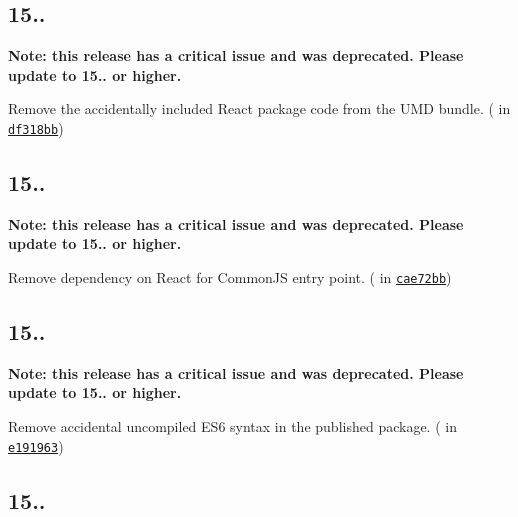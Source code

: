 \subsection*{15..}

{\bfseries Note\+: this release has a critical issue and was deprecated. Please update to 15.. or higher.}


\begin{DoxyItemize}
\item Remove the accidentally included React package code from the U\+MD bundle. (\href{https://github.com/acdlite}{\tt } in \href{https://github.com/reactjs/prop-types/commit/df318bba8a89bc5aadbb0292822cf4ed71d27ace}{\tt df318bb})
\end{DoxyItemize}

\subsection*{15..}

{\bfseries Note\+: this release has a critical issue and was deprecated. Please update to 15.. or higher.}


\begin{DoxyItemize}
\item Remove dependency on React for Common\+JS entry point. (\href{https://github.com/acdlite}{\tt } in \href{https://github.com/reactjs/prop-types/commit/cae72bb281a3766c765e3624f6088c3713567e6d}{\tt cae72bb})
\end{DoxyItemize}

\subsection*{15..}

{\bfseries Note\+: this release has a critical issue and was deprecated. Please update to 15.. or higher.}


\begin{DoxyItemize}
\item Remove accidental uncompiled E\+S6 syntax in the published package. (\href{https://github.com/acdlite}{\tt } in \href{https://github.com/facebook/react/commit/e1919638b39dd65eedd250a8bb649773ca61b6f1}{\tt e191963})
\end{DoxyItemize}

\subsection*{15..}


